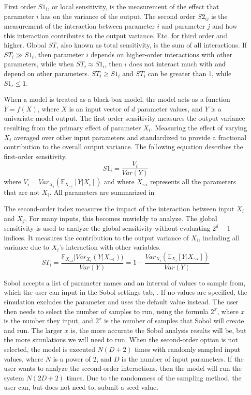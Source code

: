 First order $S1_i$, or local sensitivity, is the measurement of the effect that parameter $i$ has on the variance of the output. 
The second order $S2_{ij}$ is the measurement of the interaction between parameter $i$ and parameter $j$ and how this interaction contributes to the output variance. 
Etc. for third order and higher. 
Global $ST$, also known as total sensitivity, is the sum of all interactions. 
If $ST_i \gg S1_i$, then parameter $i$ depends on higher-order interactions with other parameters, while when $ST_i \approx S1_i$, then $i$ does not interact much with and depend on other parameters.
$ST_i \geq S1_i$ and $ST_i$ can be greater than 1, while $S1_i \leq 1$. 

When a model is treated as a black-box model, the model acts as a function $Y=f(X)$, where $X$ is an input vector of $d$ parameter values, and $Y$ is a univariate model output.
The first-order sensitivity measures the output variance resulting from the primary effect of parameter $X_i$.
Measuring the effect of varying $X_i$ averaged over other input parameters and standardized to provide a fractional contribution to the overall output variance.
The following equation describes the first-order sensitivity. 
\[
    S1_i = \frac{V_i}{\textit{Var}(Y)}
\] where $V_i = \textit{Var}_{X_i}(\mathbb{E}_{X_{\sim i}}[Y|X_i])$ and where $X_{\sim i}$ represents all the parameters that are not $X_i$.
All parameters are summarized in 

The second-order index measures the impact of the interaction between input $X_i$ and $X_j$. 
For many inputs, this becomes unwieldy to analyze.
The global sensitivity is used to analyze the global sensitivity without evaluating $2^d-1$ indices. 
It measures the contribution to the output variance of $X_i$, including all variance due to $ X_i$’s interaction with other variables.
\[
    ST_i = \frac{\mathbb{E}_{X_{\sim i}}[\textit{Var}_{X_i}(Y|X_{\sim i}))}{\textit{Var}(Y)} = 1 - \frac{\textit{Var}_{X_i}(\mathbb{E}_{X_i}[Y|X_{\sim i}])}{\textit{Var}(Y)}
\]

Sobol accepts a list of parameter names and an interval of values to sample from, which the user can input in the Sobol settings tab, . 
If no values are specified, the simulation excludes the parameter and uses the default value instead.
The user then needs to select the number of samples to run, using the formula $2^x$, where $x$ is the number they input, and $2^x$ is the number of samples that Sobol will create and run.
The larger $x$ is, the more accurate the Sobol analysis results will be, but the more simulations we will need to run. 
When the second-order option is not selected, the model is executed $N(D+2)$ times with randomly sampled input values, where $N$ is a power of 2, and $D$ is the number of input parameters.
If the user wants to analyze the second-order interactions, then the model will run the system $N(2D+2)$ times.
Due to the randomness of the sampling method, the user can, but does not need to, submit a seed value. 

